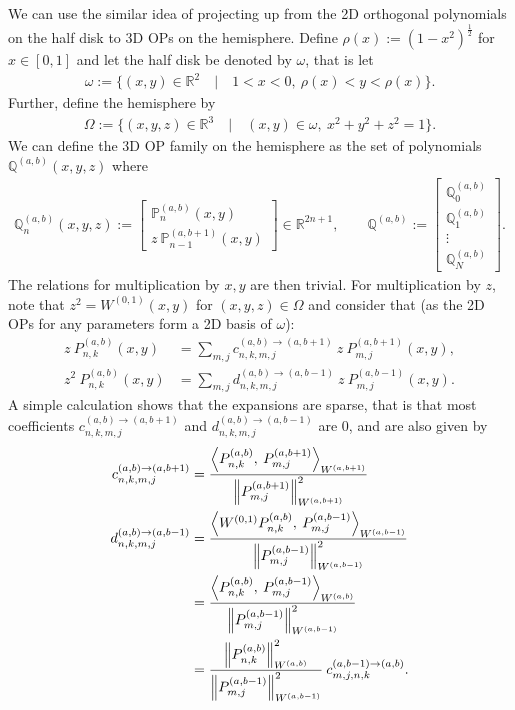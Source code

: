 \documentclass[11pt, oneside]{article}   	%
\newcommand{\half}{\frac{1}{2}}
\newcommand{\R}{\mathbb{R}}
\newcommand{\bigP}{\mathbb{P}}
\newcommand{\Pnkab}{P_{n,k}^{(a,b)}}
\newcommand{\Wab}{{W^{(a,b)}}}
\newcommand{\bigPab}{\bigP^{(a,b)}}
\newcommand{\bigQ}{\mathbb{Q}}
\newcommand{\bigQab}{\bigQ^{(a,b)}}
\begin{document}
We can use the similar idea of projecting up from the 2D orthogonal polynomials on the half disk to 3D OPs on the hemisphere. Define $\rho(x) := (1-x^2)^\half$ for $x \in [0,1]$ and let the half disk be denoted by $\omega$, that is let
\begin{align}
	\omega := \{(x,y) \in \R^2 \quad | \quad 1 < x < 0, \: \rho(x) < y < \rho(x)\}.
\end{align}
Further, define the hemisphere by
\begin{align}
	\Omega := \{(x,y,z) \in \R^3 \quad | \quad (x,y) \in \omega, \: x^2 + y^2 + z^2 = 1\}.
\end{align}
We can define the 3D OP family on the hemisphere as the set of polynomials $\bigQab(x,y,z)$ where
\begin{align}
	\bigQab_n(x,y,z) := \begin{bmatrix}
		\bigPab_n(x,y) \\
		z \: \bigP^{(a,b+1)}_{n-1}(x,y)
	\end{bmatrix} \in \R^{2n+1}, 
	\quad \quad 
	\bigQab := \begin{bmatrix}
		\bigQab_0 \\
		\bigQab_1 \\
		\vdots \\
		\bigQab_N
	\end{bmatrix}.
\end{align}
The relations for multiplication by $x, y$ are then trivial. For multiplication by $z$, note that $z^2 = W^{(0,1)}(x,y)$ for $(x,y,z) \in \Omega$ and consider that (as the 2D OPs for any parameters form a 2D basis of $\omega$):
\begin{align}
	z \: \Pnkab(x,y) &= \sum_{m,j} c_{n,k,m,j}^{(a,b)\to(a,b+1)} \: z \: P^{(a,b+1)}_{m,j}(x,y), \\
	z^2 \: \Pnkab(x,y) &= \sum_{m,j} d_{n,k,m,j}^{(a,b)\to(a,b-1)} \: z \: P^{(a,b-1)}_{m,j}(x,y).
\end{align}
A simple calculation shows that the expansions are sparse, that is that most coefficients $c_{n,k,m,j}^{(a,b)\to(a,b+1)}$ and $d_{n,k,m,j}^{(a,b)\to(a,b-1)}$ are $0$, and are also given by
\begin{align}
	c_{n,k,m,j}^{(a,b)\to(a,b+1)} &= \frac{\ip< \Pnkab, \: P^{(a,b+1)}_{m,j} >_{W^{(a,b+1)}}}{\norm{P^{(a,b+1)}_{m,j}}^2_{W^{(a,b+1)}}} \\
	d_{n,k,m,j}^{(a,b)\to(a,b-1)} &= \frac{\ip< W^{(0,1)} \Pnkab, \: P^{(a,b-1)}_{m,j} >_{W^{(a,b-1)}}}{\norm{P^{(a,b-1)}_{m,j}}^2_{W^{(a,b-1)}}} \nonumber \\
	&= \frac{\ip< \Pnkab, \: P^{(a,b-1)}_{m,j} >_{W^{(a,b)}}}{\norm{P^{(a,b-1)}_{m,j}}^2_{W^{(a,b-1)}}} \nonumber \\
	&= \frac{\norm{\Pnkab}_\Wab^2}{\norm{P^{(a,b-1)}_{m,j}}^2_{W^{(a,b-1)}}} \: c_{m,j,n,k}^{(a,b-1)\to(a,b)}.
\end{align}
\end{document}
